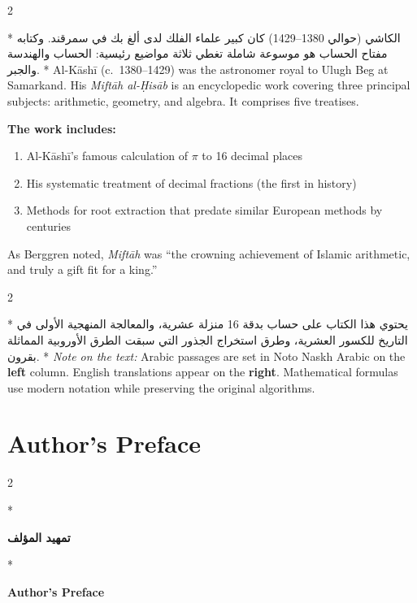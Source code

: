 \documentclass[11pt,a4paper]{article}
\newcommand{\ar}[1]{\arabicfont\beginR #1\endR}
\newenvironment{bilingual}{%
  \vspace{0.3em}%
  \begin{paracol}{2}%
}{%
  \end{paracol}%
  \vspace{0.3em}%
}
\begin{document}
\begin{bilingual}
\switchcolumn[0]*
\ar{الكاشي (حوالي 1380--1429) كان كبير علماء الفلك لدى ألغ بك في سمرقند. وكتابه مفتاح الحساب هو موسوعة شاملة تغطي ثلاثة مواضيع رئيسية: الحساب والهندسة والجبر.}
\switchcolumn[1]*
Al-K\=ash\=i (c.\ 1380--1429) was the astronomer royal to Ulugh Beg at
Samarkand. His \textit{Mift\=ah al-\d{H}is\=ab} is an encyclopedic work covering
three principal subjects: arithmetic, geometry, and algebra. It comprises
five treatises.
\end{bilingual}

\textbf{The work includes:}
\begin{enumerate}[nosep]
  \item Al-K\=ash\=i's famous calculation of $\pi$ to 16 decimal places
  \item His systematic treatment of decimal fractions (the first in history)
  \item Methods for root extraction that predate similar European methods by centuries
\end{enumerate}

As Berggren noted, \textit{Mift\=ah} was ``the crowning achievement of Islamic arithmetic, and truly a gift fit for a king.''

\begin{bilingual}
\switchcolumn[0]*
\ar{يحتوي هذا الكتاب على حساب \pi بدقة 16 منزلة عشرية، والمعالجة المنهجية الأولى في التاريخ للكسور العشرية، وطرق استخراج الجذور التي سبقت الطرق الأوروبية المماثلة بقرون.}
\switchcolumn[1]*
\textit{Note on the text:} Arabic passages are set in Noto Naskh
Arabic on the \textbf{left} column. English translations appear on the \textbf{right}. Mathematical formulas use modern notation while preserving the
original algorithms.
\end{bilingual}
\clearpage

\section*{Author's Preface}

\begin{bilingual}
\switchcolumn[0]*
\begin{center}
\textbf{\color{chapcolor}\ar{تمهيد المؤلف}}
\end{center}
\switchcolumn[1]*
\begin{center}
\textbf{\color{chapcolor}Author's Preface}
\end{center}
\end{bilingual}
\end{document}
